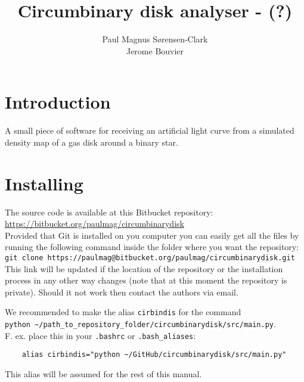 \documentclass[a4paper, 12pt, english, titlepage]{article}
\title{Circumbinary disk analyser - \sname(?)}
\author{Paul Magnus Sørensen-Clark \\ Jerome Bouvier}
\begin{document}
\maketitle


\section{Introduction}

A small piece of software for receiving an artificial light curve from a simulated density map of a gas disk around a binary star.


\section{Installing}

The source code is available at this Bitbucket repository: \\
\url{https://bitbucket.org/paulmag/circumbinarydisk} \\
Provided that Git is installed on you computer you can easily get all the files by running the following command inside the folder where you want the repository: \\
\texttt{git clone https://paulmag@bitbucket.org/paulmag/circumbinarydisk.git} \\
This link will be updated if the location of the repository or the installation process in any other way changes (note that at this moment the repository is private).
Should it not work then contact the authors via email.

We recommended to make the alias \texttt{cirbindis} for the command \\
\texttt{python \textasciitilde/path\_to\_repository\_folder/circumbinarydisk/src/main.py}. \\
F. ex. place this in your \texttt{.bashrc} or \texttt{.bash\_aliases}:
\begin{verbatim}
    alias cirbindis="python ~/GitHub/circumbinarydisk/src/main.py"
\end{verbatim}
This alias will be assumed for the rest of this manual.


\end{document}
